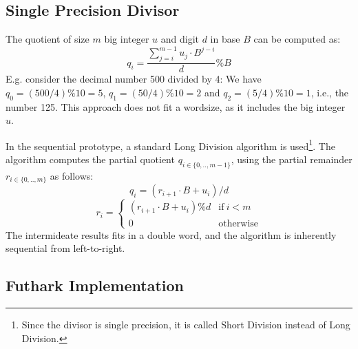 \subsection{Single Precision Divisor}



The quotient of size $m$ big integer $u$ and digit $d$ in base $B$ can be
computed as:
\begin{equation}
  \label{eq:1}
  q_i = \dfrac{\sum_{j=i}^{m-1} u_j \cdot B^{j-i}}{d}\% B
\end{equation}
E.g. consider the decimal number 500 divided by 4: We have
$q_0 = (500 / 4) \% 10 = 5$, $q_1 = (50 / 4) \% 10 = 2$ and
$q_2 = (5 / 4) \% 10 = 1$, i.e., the number 125. This approach does not fit a
wordsize, as it includes the big integer $u$.

In the sequential prototype, a standard Long Division algorithm is
used\footnote{Since the divisor is single precision, it is called Short Division
  instead of Long Division.}. The algorithm computes the partial quotient
$q_{i\in\{0,..,m-1\}}$, using the partial remainder $r_{i\in\{0,..,m\}}$ as follows:
\begin{equation}
  \label{eq:1}
  q_i = \left( r_{i+1} \cdot B + u_i\right) / d
\end{equation}
\begin{equation}
  \label{eq:1}
  r_i = \begin{cases} \left( r_{i+1} \cdot B + u_i\right) \% d & \text{if}~i<m \\ 0 & \text{otherwise} \end{cases}
\end{equation}
The intermideate results fits in a double word, and the algorithm is inherently
sequential from left-to-right.


\subsection{Futhark Implementation}


